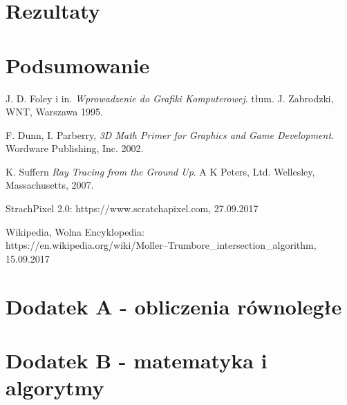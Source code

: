 \documentclass[12pt]{report}
\begin{document}
\chapter{Rezultaty}


\chapter{Podsumowanie}


\begin{thebibliography}{9}

  J. D. Foley i in.
  \emph{Wprowadzenie do Grafiki Komputerowej}.
  tłum. J. Zabrodzki,
  WNT, Warszawa
  1995.
  
  F. Dunn, I. Parberry,
  \emph{3D Math Primer for Graphics and Game Development}.
  Wordware Publishing, Inc.
  2002.
  
	K. Suffern
	\emph{Ray Tracing from the Ground Up}.
	A K Peters, Ltd.
	Wellesley, Massachusetts,
	2007.
	
	StrachPixel 2.0:
	https://www.scratchapixel.com, 27.09.2017
	
	Wikipedia, Wolna Encyklopedia:\\ 
	https://en.wikipedia.org/wiki/Moller–Trumbore\_intersection\_algorithm, 15.09.2017

	
\end{thebibliography}

\listoffigures

\chapter{Dodatek A - obliczenia równoległe}
\chapter{Dodatek B - matematyka i algorytmy} 
\end{document}
